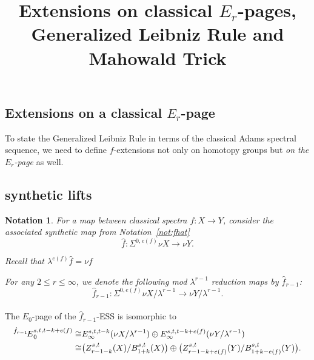 \documentclass[12pt,a4paper]{article}
\title{Extensions on classical $E_r$-pages, Generalized Leibniz Rule and Mahowald Trick}
\author{}
\newtheorem{notation}[equation]{Notation}
\newcommand{\ESS}[1]{\prescript{#1\!}{}{E}}
\newcommand{\Sus}{\Sigma}
\newcommand{\iso}{\cong}
\begin{document}
\sffamily
\maketitle
\thispagestyle{empty}

\huge

\begin{sloppy}


\section{Extensions on a classical $E_r$-page} \label{sec:extenpage}

To state the Generalized Leibniz Rule in terms of the classical Adams spectral sequence, we need to define $f$-extensions not only on homotopy groups but \emph{on the $E_r$-page} as well.

\subsection{synthetic lifts}

\begin{notation}
For a map between classical spectra $f: X\to Y$, consider the associated synthetic map from Notation~\ref{not:fhat}
$$\hat f: \Sus^{0,e(f)}\nu X\to \nu Y.$$

Recall that $\lambda^{e(f)}\hat{f} = \nu f$

For any $2\le r\le \infty$, we denote the following mod $\lambda^{r-1}$ reduction maps by $\hat f_{r-1}$:
$$\hat f_{r-1}: \Sus^{0,e(f)}\nu X/\lambda^{r-1}\to \nu Y/\lambda^{r-1}.$$
\end{notation}

\paragraph{}

The $E_0$-page of the $\hat f_{r-1}$-ESS is isomorphic to
{\Large
$$\begin{aligned}
    \ESS{\hat f_{r-1}}_0^{s,t,t-k+e(f)}\iso & E_\infty^{s,t,t-k}(\nu X/\lambda^{r-1})\oplus E_\infty^{s,t,t-k+e(f)}(\nu Y/\lambda^{r-1})\\
    \iso & \big(Z_{r-1-k}^{s,t}(X)/B_{1+k}^{s,t}(X)\big)\oplus \big(Z_{r-1-k+e(f)}^{s,t}(Y)/B_{1+k-e(f)}^{s,t}(Y)\big).
\end{aligned}$$
}

\end{sloppy}
\end{document}
